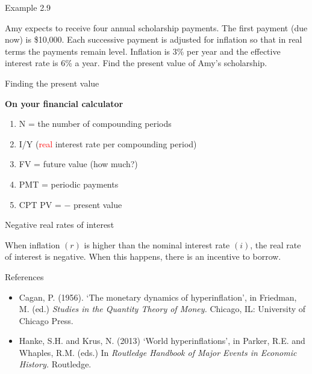 \documentclass{beamer}
\begin{document}
\begin{frame}{Example 2.9}

Amy expects to receive four annual scholarship payments. The first payment (due now) is \$10,000. Each successive payment is adjusted for inflation so that in real terms the payments remain level. Inflation is 3\% per year and the effective interest rate is 6\% a year. Find the present value of Amy's scholarship.

\vfill
\end{frame}

\begin{frame}{Finding the present value}

\textbf{On your financial calculator}
\begin{enumerate}
\item N = the number of compounding periods
\item I/Y (\textcolor{red}{real} interest rate per compounding period)
\item FV = future value (how much?)
\item PMT = periodic payments
\item CPT PV = $-$ present value
\end{enumerate}

\end{frame}

\begin{frame}{Negative real rates of interest}

When inflation $(r)$ is higher than the nominal interest rate $(i)$, the real rate of interest is negative. When this happens, there is an incentive to borrow.

\bigskip
{}

\end{frame}

\begin{frame}{References}

\small
\begin{itemize}
\item[] Cagan, P. (1956). `The monetary dynamics of hyperinflation', in Friedman, M. (ed.) \textit{Studies in the Quantity Theory of Money.} Chicago, IL: University of Chicago Press.
\item[] Hanke, S.H. and Krus, N. (2013) `World hyperinflations', in Parker, R.E. and Whaples, R.M. (eds.) In \textit{Routledge Handbook of Major Events in Economic History.} Routledge.
\end{itemize}

\end{frame}
\end{document}

